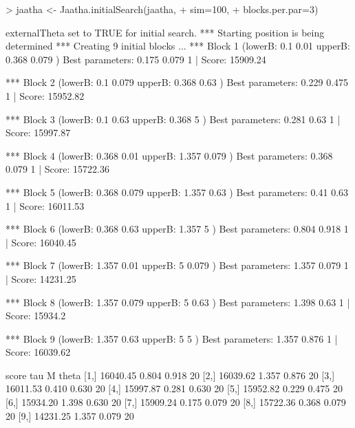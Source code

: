 
\begin{Schunk}
\begin{Sinput}
> jaatha <- Jaatha.initialSearch(jaatha, 
+                                sim=100, 
+                                blocks.per.par=3)
\end{Sinput}
\begin{Soutput}
externalTheta set to TRUE for initial search. 
*** Starting position is being determined *** 
Creating 9 initial blocks ...  
*** Block 1  (lowerB: 0.1 0.01  upperB: 0.368 0.079 ) 
Best parameters:  0.175 0.079 1 | Score: 15909.24 

*** Block 2  (lowerB: 0.1 0.079  upperB: 0.368 0.63 ) 
Best parameters:  0.229 0.475 1 | Score: 15952.82 

*** Block 3  (lowerB: 0.1 0.63  upperB: 0.368 5 ) 
Best parameters:  0.281 0.63 1 | Score: 15997.87 

*** Block 4  (lowerB: 0.368 0.01  upperB: 1.357 0.079 ) 
Best parameters:  0.368 0.079 1 | Score: 15722.36 

*** Block 5  (lowerB: 0.368 0.079  upperB: 1.357 0.63 ) 
Best parameters:  0.41 0.63 1 | Score: 16011.53 

*** Block 6  (lowerB: 0.368 0.63  upperB: 1.357 5 ) 
Best parameters:  0.804 0.918 1 | Score: 16040.45 

*** Block 7  (lowerB: 1.357 0.01  upperB: 5 0.079 ) 
Best parameters:  1.357 0.079 1 | Score: 14231.25 

*** Block 8  (lowerB: 1.357 0.079  upperB: 5 0.63 ) 
Best parameters:  1.398 0.63 1 | Score: 15934.2 

*** Block 9  (lowerB: 1.357 0.63  upperB: 5 5 ) 
Best parameters:  1.357 0.876 1 | Score: 16039.62 

         score   tau     M theta
 [1,] 16040.45 0.804 0.918    20
 [2,] 16039.62 1.357 0.876    20
 [3,] 16011.53 0.410 0.630    20
 [4,] 15997.87 0.281 0.630    20
 [5,] 15952.82 0.229 0.475    20
 [6,] 15934.20 1.398 0.630    20
 [7,] 15909.24 0.175 0.079    20
 [8,] 15722.36 0.368 0.079    20
 [9,] 14231.25 1.357 0.079    20
\end{Soutput}
\end{Schunk}

